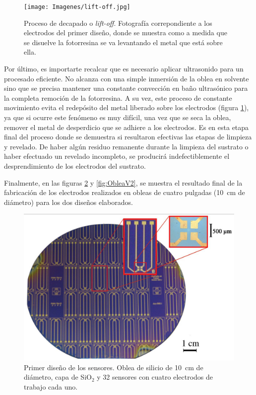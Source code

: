 {					  %
					  \begin{figure}[ht!]
					  \begin{center}
					  \texttt{[image: Imagenes/lift-off.jpg]}
					  \caption[Proceso de decapado o\textit{ lift-off}]{Proceso de decapado o\textit{ lift-off}. Fotografía correpondiente a los electrodos del primer diseño, donde se muestra como a medida que se disuelve la fotorresina se va levantando el metal que está sobre ella.}
					  \label{fig:ultrasonido}
					  \end{center}
					  \end{figure}

		 Por último, es importarte recalcar que es necesario aplicar ultrasonido para un procesado eficiente. No alcanza con una simple inmersión de la oblea en solvente sino que se precisa mantener una constante convección en baño ultrasónico para la completa remoción de la fotorresina. A su vez, este proceso de constante movimiento evita el redepósito del metal liberado sobre los electrodos (figura \ref{fig:ultrasonido}), ya que si ocurre este fenómeno es muy difícil, una vez que se seca la oblea, remover el metal de desperdicio que se adhiere a los electrodos. Es en esta etapa final del proceso donde se demuestra si resultaron efectivas las etapas de limpieza y revelado. De haber algún residuo remanente durante la limpieza del sustrato o haber efectuado un revelado incompleto, se producirá indefectiblemente el desprendimiento de los electrodos del sustrato.

		 Finalmente, en las figuras \ref{fig:ObleaV1} y \ref{fig:ObleaV2}, se muestra el resultado final de la fabricación de los electrodos realizados en obleas de cuatro pulgadas (\SI{10}{\cm} de diámetro) para los dos diseños elaborados.

		 			  \clearpage
					  \begin{figure}[ht!]
					  \begin{center}
					  \includegraphics[width=\textwidth]{Imagenes/ObleaV1.jpg}
					  \caption[Electrodos, primera versión]{Primer diseño de los sensores. Oblea de silicio de \SI{10}{cm} de diámetro, capa de SiO$_2$ y 32 sensores con cuatro electrodos de trabajo cada uno.}
					  \label{fig:ObleaV1}
					  \end{center}
					  \end{figure} 	

}
